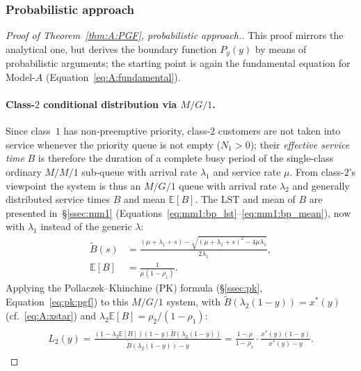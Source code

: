 \subsubsection{Probabilistic approach}\label{sssec:A:probabilistic}
\begin{proof}[Proof of Theorem~\ref{thm:A:PGF}, probabilistic approach.]
    This proof mirrors the analytical one, but derives the boundary function $P_y(y)$ by means of probabilistic arguments; the starting point is again the fundamental equation for Model-$A$ (Equation~\eqref{eq:A:fundamental}).

    \paragraph{Class-$2$ conditional distribution via $M/G/1$.}
    Since class~$1$ has non-preemptive priority, class-$2$ customers are not taken into service
    whenever the priority queue is not empty ($N_1>0$); their \emph{effective service time} $B$ is therefore the duration of a complete busy period of the single-class ordinary $M/M/1$ sub-queue with arrival rate $\lambda_1$ and service rate $\mu$. From class-$2$'s viewpoint the system is thus an $M/G/1$ queue with arrival rate $\lambda_2$ and generally distributed service times $B$ and mean $\mathbb{E}[B]$. The LST and mean of $B$ are presented
    in~\S\ref{ssec:mm1} (Equations~\eqref{eq:mm1:bp_lst}--\eqref{eq:mm1:bp_mean}), now
    with $\lambda_1$ instead of the generic $\lambda$:
    \begin{align*}
        \widetilde{B}(s) &= \frac{(\mu+\lambda_1+s) - \sqrt{(\mu + \lambda_1 + s)^2-4\mu\lambda_1}}{2\lambda_1}, \\
        \mathbb{E}[B] &= \frac{1}{\mu(1-\rho_1)}. 
    \end{align*}
    Applying the Pollaczek--Khinchine (PK) formula (\S\ref{ssec:pk},
    Equation~\eqref{eq:pk:pgf}) to this $M/G/1$ system, with
    $\widetilde{B}(\lambda_2(1-y))=x^*(y)$ (cf.~\eqref{eq:A:xstar}) and
    $\lambda_2\mathbb{E}[B]=\rho_2/(1-\rho_1)$:
    \begin{align*}
        \begin{split}
            L_2(y) = \frac{(1 - \lambda_2 \mathbb{E}[B]) (1-y) \widetilde{B}(\lambda_2(1-y))}{\widetilde{B}(\lambda_2(1-y)) - y}
                    = \frac{1-\rho}{1-\rho_1} \cdot \frac{x^*(y)(1-y)}{x^*(y) - y}.
        \end{split}
    \end{align*}

\end{proof}
